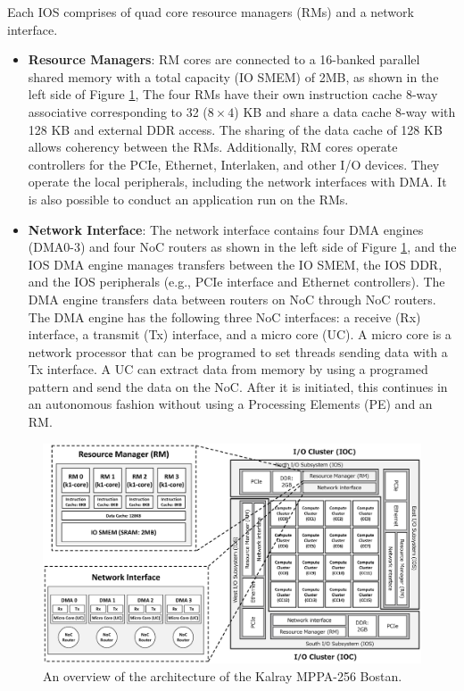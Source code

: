 \documentclass{sig-alternate-05-2015}
\begin{document}
Each IOS comprises of quad core resource managers (RMs) and a network interface.
\begin{itemize}
\item \textbf{Resource Managers}: RM cores are connected to a 16-banked parallel shared memory with a total capacity (IO SMEM) of 2MB, as shown in the left side of Figure \ref{fig:mppa_architecture},
The four RMs have their own instruction cache 8-way associative corresponding to 32 ($8 \times 4$) KB and share a data cache 8-way with 128 KB and external DDR access.
The sharing of the data cache of 128 KB allows coherency between the RMs.
Additionally, RM cores operate controllers for the PCIe, Ethernet, Interlaken, and other I/O devices.
They operate the local peripherals, including the network interfaces with DMA.
It is also possible to conduct an application run on the RMs.
\item \textbf{Network Interface}: The network interface contains four DMA engines (DMA0-3) and four NoC routers as shown in the left side of Figure \ref{fig:mppa_architecture}, and the IOS DMA engine manages transfers between the IO SMEM, the IOS DDR, and the IOS peripherals (e.g., PCIe interface and Ethernet controllers).
The DMA engine transfers data between routers on NoC through NoC routers.
The DMA engine has the following three NoC interfaces: a receive (Rx) interface, a transmit (Tx) interface, and a micro core (UC).
A micro core is a network processor that can be programed to set threads sending data with a Tx interface.
A UC can extract data from memory by using a programed pattern and send the data on the NoC.
After it is initiated, this continues in an autonomous fashion without using a Processing Elements (PE) and an RM.
\end{itemize}

\begin{figure}[t]
  \centering
  \includegraphics[width=1.0\linewidth]{../figure/mppa_architecture.eps}
  \caption{\label{fig:mppa_architecture}
    An overview of the architecture of the Kalray MPPA-256 Bostan.}
\end{figure}
\end{document}
